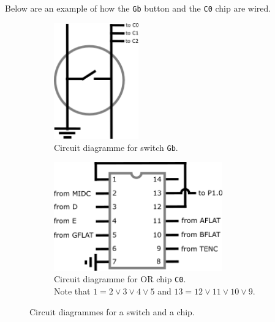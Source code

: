 \documentclass[letterpaper]{report}
\begin{document}
			Below are an example of how the \texttt{Gb} button and the \texttt{C0} chip are wired.
			\begin{figure}[H]
				\centering
				\begin{subfigure}{0.5\textwidth}
					\centering
					\includegraphics[width=0.4\textwidth]{switch}
					\caption{Circuit diagramme for switch \texttt{Gb}.}
				\end{subfigure}%
				\begin{subfigure}{0.5\textwidth}
					\centering
					\includegraphics[width=0.8\textwidth]{orgate}
					\caption{Circuit diagramme for OR chip \texttt{C0}.\\ Note that $1 = 2 \vee 3 \vee 4 \vee 5$ and $13 = 12 \vee 11 \vee 10 \vee 9$.}
				\end{subfigure}
				\caption{Circuit diagrammes for a switch and a chip.}
			\end{figure}
			
\end{document}
